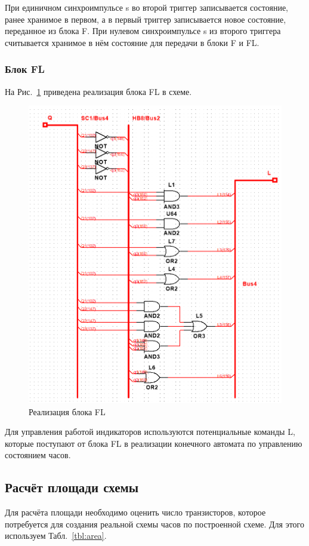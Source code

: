 \documentclass[a4paper, final]{article}
\begin{document}
При единичном синхроимпульсе s во второй триггер записывается состояние, ранее хранимое в первом, а в первый триггер записывается новое состояние, переданное из блока F. При нулевом синхроимпульсе s из второго триггера считывается хранимое в нём состояние для передачи в блоки F и FL.

\subsubsection{Блок FL}
На Рис.~\ref{img:FL} приведена реализация блока FL в схеме.

\newpage
\begin{figure}[H]
   \centering
   \includegraphics[width=\linewidth]{FL.png}
   \caption{Реализация блока FL}
   \label{img:FL}
\end{figure}

Для управления работой индикаторов используются потенциальные команды L, которые поступают от блока FL в реализации конечного автомата по управлению состоянием часов. 

\subsection{Расчёт площади схемы}
Для расчёта площади необходимо оценить число транзисторов, которое потребуется для создания реальной схемы часов по построенной схеме. Для этого используем Табл.~\ref{tbl:area}.
\end{document}
